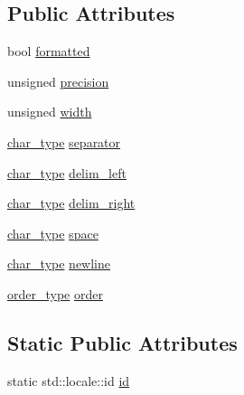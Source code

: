 \subsection*{Public Attributes}
\begin{DoxyCompactItemize}
\item 
bool \mbox{\hyperlink{classglm_1_1io_1_1format__punct_ab28088e6eef03fe4222fa8a5dd95288e}{formatted}}
\item 
unsigned \mbox{\hyperlink{classglm_1_1io_1_1format__punct_a5a15d396b7c963df9dec5e124236dc02}{precision}}
\item 
unsigned \mbox{\hyperlink{classglm_1_1io_1_1format__punct_a95d32ca2330bbf7c50d3e066b7a851db}{width}}
\item 
\mbox{\hyperlink{classglm_1_1io_1_1format__punct_ae94c42484a4c5258ad7b2f0f029efdf3}{char\+\_\+type}} \mbox{\hyperlink{classglm_1_1io_1_1format__punct_ac561eb04fc2a1282ef38ea15f8e640ee}{separator}}
\item 
\mbox{\hyperlink{classglm_1_1io_1_1format__punct_ae94c42484a4c5258ad7b2f0f029efdf3}{char\+\_\+type}} \mbox{\hyperlink{classglm_1_1io_1_1format__punct_ab1beed331269a39b06d17d02cf727d7c}{delim\+\_\+left}}
\item 
\mbox{\hyperlink{classglm_1_1io_1_1format__punct_ae94c42484a4c5258ad7b2f0f029efdf3}{char\+\_\+type}} \mbox{\hyperlink{classglm_1_1io_1_1format__punct_a62fb1280404360463ec5af7144aa0949}{delim\+\_\+right}}
\item 
\mbox{\hyperlink{classglm_1_1io_1_1format__punct_ae94c42484a4c5258ad7b2f0f029efdf3}{char\+\_\+type}} \mbox{\hyperlink{classglm_1_1io_1_1format__punct_adf9a915938727793de1daca07dcdfa4e}{space}}
\item 
\mbox{\hyperlink{classglm_1_1io_1_1format__punct_ae94c42484a4c5258ad7b2f0f029efdf3}{char\+\_\+type}} \mbox{\hyperlink{classglm_1_1io_1_1format__punct_a8ddf8abdb0ebbdbb7eca08d7a777956e}{newline}}
\item 
\mbox{\hyperlink{namespaceglm_1_1io_a3497781803fe594a37177e05ab2a795f}{order\+\_\+type}} \mbox{\hyperlink{classglm_1_1io_1_1format__punct_a9de1f3b7120a036ec0ab394d2036d0aa}{order}}
\end{DoxyCompactItemize}
\subsection*{Static Public Attributes}
\begin{DoxyCompactItemize}
\item 
static std\+::locale\+::id \mbox{\hyperlink{classglm_1_1io_1_1format__punct_a763f60aeaecec9290917ed1d83b79838}{id}}
\end{DoxyCompactItemize}
